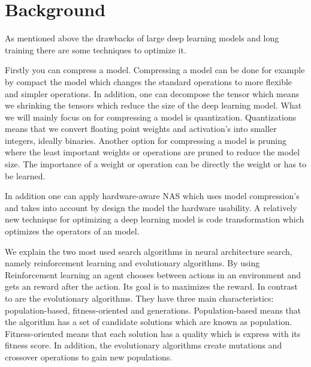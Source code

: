 \documentclass[conference]{IEEEtran}
\begin{document}
\section{Background}
As mentioned above the drawbacks of large deep learning models and long training there are some techniques to optimize it.

Firstly you can compress a model. Compressing a model can be done for example by compact the model which changes the standard operations to more flexible and simpler operations. In addition, one can decompose the tensor which means we shrinking the tensors which reduce the size of the deep learning model. What we will mainly focus on for compressing a model is quantization. Quantizations means that we convert floating point weights and activation's into smaller integers, ideally binaries. Another option for compressing a model is pruning where the least important weights or operations are pruned to reduce the model size. The importance of a weight or operation can be directly the weight or has to be learned. 

In addition one can apply hardware-aware NAS which uses model compression's and takes into account by design the model the hardware usability. A relatively new technique for optimizing a deep learning model is code transformation which optimizes the operators of an model.

We explain the two most used search algorithms in neural architecture search, namely reinforcement learning and evolutionary algorithms. By using Reinforcement learning an agent chooses between actions in an environment and gets an reward after the action. Its goal is to maximizes the reward. In contrast to are the evolutionary algorithms. They have three main characteristics: population-based, fitness-oriented and generations. Population-based means that the algorithm has a set of candidate solutions which are known as population. Fitness-oriented means that each solution has a quality which is express with its fitness score. In addition, the evolutionary algorithms create mutations and crossover operations to gain new populations. 
\end{document}
